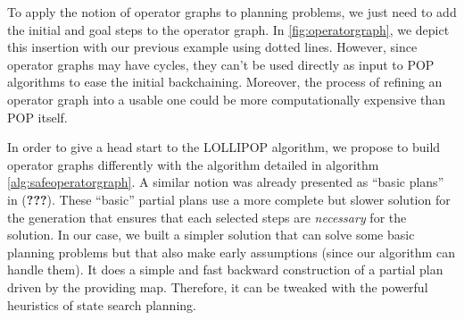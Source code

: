 \documentclass[11pt,a4paper,twoside,openright,titlepage,numbers=noenddot,headinclude,cleardoublepage=empty,openany]{scrreprt}
\theoremstyle{plain}
\theoremstyle{definition}
\theoremstyle{remark}
\newcommand{\Continue}{\State \algorithmiccontinue}
\begin{document}
To apply the notion of operator graphs to planning problems, we just
need to add the initial and goal steps to the operator graph. In
\cref{fig:operatorgraph}, we depict this insertion with our previous
example using dotted lines. However, since operator graphs may have
cycles, they can't be used directly as input to POP algorithms to ease
the initial backchaining. Moreover, the process of refining an operator
graph into a usable one could be more computationally expensive than POP
itself.

In order to give a head start to the LOLLIPOP algorithm, we propose to
build operator graphs differently with the algorithm detailed in
algorithm \ref{alg:safeoperatorgraph}. A similar notion was already
presented as ``basic plans'' in ({\textbf{???}}). These ``basic''
partial plans use a more complete but slower solution for the generation
that ensures that each selected steps are \emph{necessary} for the
solution. In our case, we built a simpler solution that can solve some
basic planning problems but that also make early assumptions (since our
algorithm can handle them). It does a simple and fast backward
construction of a partial plan driven by the providing map. Therefore,
it can be tweaked with the powerful heuristics of state search planning.

\end{document}
